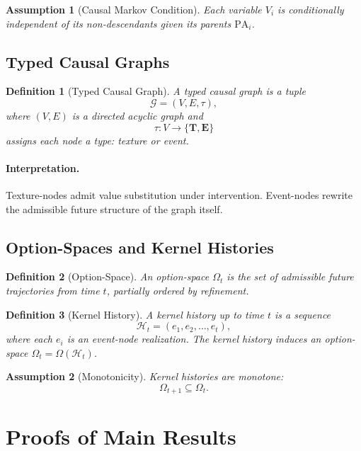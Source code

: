 \documentclass[11pt]{article}
\newtheorem{definition}{Definition}
\newtheorem{assumption}{Assumption}
\theoremstyle{remark}
\newcommand{\Hist}{\mathcal{H}}
\newcommand{\Tnode}{\mathbf{T}}
\newcommand{\Enode}{\mathbf{E}}
\begin{document}
\begin{assumption}[Causal Markov Condition]
Each variable $V_i$ is conditionally independent of its non-descendants
given its parents $\mathrm{PA}_i$.
\end{assumption}

\subsection{Typed Causal Graphs}

\begin{definition}[Typed Causal Graph]
A typed causal graph is a tuple
\[
\mathcal{G} = (V, E, \tau),
\]
where $(V,E)$ is a directed acyclic graph and
\[
\tau : V \to \{\Tnode, \Enode\}
\]
assigns each node a type: texture or event.
\end{definition}

\paragraph{Interpretation.}
Texture-nodes admit value substitution under intervention. Event-nodes
rewrite the admissible future structure of the graph itself.

\subsection{Option-Spaces and Kernel Histories}

\begin{definition}[Option-Space]
An option-space $\Omega_t$ is the set of admissible future trajectories
from time $t$, partially ordered by refinement.
\end{definition}

\begin{definition}[Kernel History]
A kernel history up to time $t$ is a sequence
\[
\Hist_t = (e_1, e_2, \ldots, e_t),
\]
where each $e_i$ is an event-node realization. The kernel history
induces an option-space $\Omega_t = \Omega(\Hist_t)$.
\end{definition}

\begin{assumption}[Monotonicity]
Kernel histories are monotone:
\[
\Omega_{t+1} \subseteq \Omega_t.
\]
\end{assumption}

\section{Proofs of Main Results}
\end{document}
